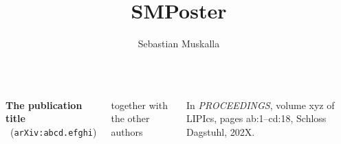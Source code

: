 \documentclass
[
    folder=../style,
    25pt,
    a1paper,
    portrait,
    margin=0mm,
    innermargin=15mm,
    blockverticalspace=15mm,
    colspace=15mm,
    subcolspace=8mm,
]
{../style/smposter}
\title{SMPoster}
\author{Sebastian Muskalla}
\begin{document}
\maketitle

\begin{columns}



\block[]{}%
{
    \textbf{The publication title} \ (\texttt{arXiv:abcd.efghi})

    together with the other authors

    In \textit{PROCEEDINGS}, volume xyz of LIPIcs, pages ab:1--cd:18, Schloss Dagstuhl, 202X.
}


\end{columns}
\end{document}
